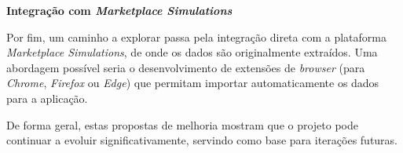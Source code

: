 \textbf{Integração com \textit{Marketplace Simulations}}

Por fim, um caminho a explorar passa pela integração direta com a plataforma \textit{Marketplace Simulations}, de onde os dados são originalmente extraídos. Uma abordagem possível seria o desenvolvimento de extensões de \textit{browser} (para \textit{Chrome}, \textit{Firefox} ou \textit{Edge}) que permitam importar automaticamente os dados para a aplicação.

De forma geral, estas propostas de melhoria mostram que o projeto pode continuar a evoluir significativamente, servindo como base para iterações futuras.